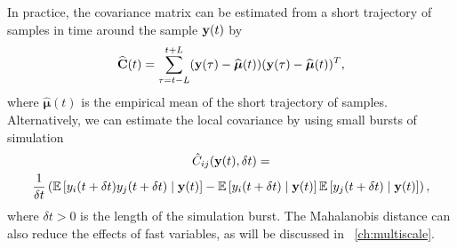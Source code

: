 In practice, the covariance matrix can be estimated from a short trajectory of samples in time around the sample $\mathbf{y}(t)$ by
\begin{equation} \label{eq:cov1}
	\widehat{\mathbf{C}}(t) = \sum \limits _{\tau = t-L}^{t+L} (\mathbf{y}(\tau) - \widehat{\boldsymbol{\mu}}(t))(\mathbf{y}(\tau) - \widehat{\boldsymbol{\mu}}(t))^T,
\end{equation}
where $\widehat{\boldsymbol{\mu}}(t)$ is the empirical mean of the short trajectory of samples.
%
Alternatively, we can estimate the local covariance by using small bursts of simulation 
\begin{multline} \label{eq:cov2}
\hat{C}_{ij}(\mathbf{y}(t), \delta t)
= \\
\frac{1}{ \delta t} \left( \mathbb{E} \left[ y_i (t+\delta t) y_j (t+ \delta t) \mid \mathbf{y}(t) \right]
- \mathbb{E} \left[ y_i (t+\delta t) \mid \mathbf{y}(t) \right] \mathbb{E} \left[ y_j (t+\delta t) \mid \mathbf{y}(t) \right] \right) ,
\end{multline}
%
where $\delta t > 0$ is the length of the simulation burst.
%
The Mahalanobis distance can also reduce the effects of fast variables, as will be discussed in \chap~\ref{ch:multiscale}.

%
%
%
%
%
%


